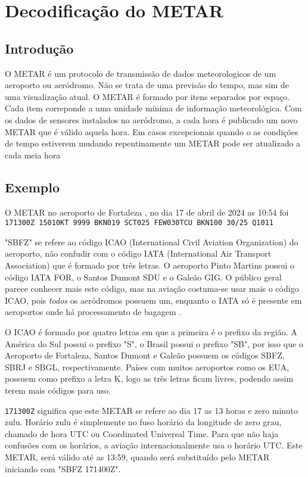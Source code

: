 \chapter{Decodificação do METAR}

\section{Introdução}
O METAR é um protocolo de transmissão de dados meteorologicos de um aeroporto ou aeródromo.
Não se trata de uma previsão do tempo, mas sim de uma visualização atual.
O METAR é formado por itens separados por espaço. Cada item correponde a uma
unidade mínima de informação meteorológica. Com os dados de sensores instalados no aeródromo\cite{metar-weather-gov}, a
cada hora é publicado um novo METAR que é válido aquela hora. Em casos excepcionais quando o as condições de tempo 
estiverem mudando repentinamente um METAR pode ser atualizado a cada meia hora \cite{METAR-speci} 

\section{Exemplo}
O METAR no aeroporto de Fortaleza \cite{METAR-sbfz}, no dia 17 de abril de 2024 as 10:54 foi
\texttt{171300Z 15010KT 9999 BKN019 SCT025 FEW030TCU BKN100 30/25 Q1011}

"SBFZ" se refere ao código ICAO (International Civil Aviation Organization) do aeroporto, não
confudir com o código IATA (International Air Transport Association) que é formado por três letras.
O aeroporto Pinto Martins possui o código IATA FOR, o Santos Dumont SDU e o Galeão GIG. O público 
geral parece conhecer mais este código, mas na aviação
costuma-se usar mais o código ICAO, pois \textit{todos} os aeródromos possuem um, enquanto o IATA só 
é presente em aeroportos onde há processamento de bagagem \cite{iata-codes} \cite{icao-codes}. 

O ICAO é formado por quatro letras em que a primeira é o prefixo da região.
A América do Sul possui o prefixo "S",
o Brasil possui o prefixo "SB", por isso que o Aeroporto de Fortaleza, Santos Dumont e Galeão possuem 
os códigos SBFZ, SBRJ e SBGL, respectivamente. Países com muitos aeroportos como os EUA, possuem
como prefixo a letra K, logo as três letras ficam livres, podendo assim terem mais códigos para uso.

\texttt{171300Z} significa que este METAR se refere ao dia 17 as 13 horas e zero minuto zulu. Horário
zulu é simplemente no fuso horário da longitude de zero grau, chamado de hora UTC ou 
Coordinated Universal Time. \cite{UTC} Para que não haja confusões com os horários, a aviação internacionalmente
usa o horário UTC. Este METAR, será válido até as 13:59,
quando será substituído pelo METAR iniciando com "SBFZ 171400Z".

